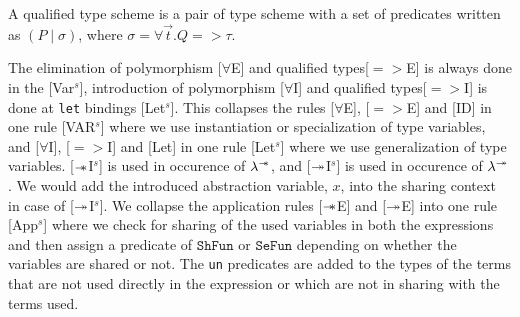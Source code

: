 \begin{defn}
  A qualified type scheme is a pair of type scheme with a set of predicates written as $(P \mid \sigma)$,
  where $\sigma = \forall \vec{t}. Q => \tau$.
\end{defn}

The elimination of polymorphism [$\forall$E] and qualified types[$=>$E] is always done in the [Var$^s$],
introduction of polymorphism [$\forall$I] and qualified types[$=>$I] is
done at \texttt{let} bindings [Let$^s$]. This collapses the rules [$\forall$E], [$=>$E] and [ID] in one rule [VAR$^s$] where
we use instantiation or specialization of type variables, and [$\forall$I], [$=>$I] and [Let] in one rule [Let$^s$] where we use generalization of type variables.
[$\mathrel{-\mkern-6mu*}$I$^s$] is used in occurence of $\lambda^{\mathrel{-\mkern-6mu*}} $, and [$\twoheadrightarrow$I$^s$] is used in occurence of $\lambda^{\twoheadrightarrow}$.
We would add the introduced abstraction variable, $x$, into the sharing context in case of [$\twoheadrightarrow$I$^s$].
We collapse the application rules [$\mathrel{-\mkern-6mu*}$E] and [$\twoheadrightarrow$E] into one rule [App$^s$] where we check for sharing of the used variables in both
the expressions and then assign a predicate of $\texttt{ShFun}$ or $\texttt{SeFun}$ depending on whether the variables
are shared or not. The \texttt{un} predicates are added to the types of the terms that are not used directly in the expression
or which are not in sharing with the terms used.

